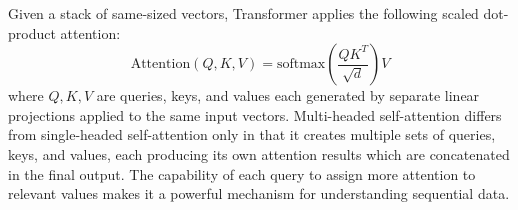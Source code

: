 Given a stack of same-sized vectors, Transformer applies the following scaled dot-product attention:
\begin{displaymath}
  \textrm{Attention}(Q, K, V) = \textrm{softmax}(\frac{QK^T}{\sqrt{d}})V
\end{displaymath}
where $Q, K, V$ are queries, keys, and values each generated by separate linear projections applied to the same input vectors. Multi-headed self-attention differs from single-headed self-attention only in that it creates multiple sets of queries, keys, and values, each producing its own attention results which are concatenated in the final output. The capability of each query to assign more attention to relevant values makes it a powerful mechanism for understanding sequential data.